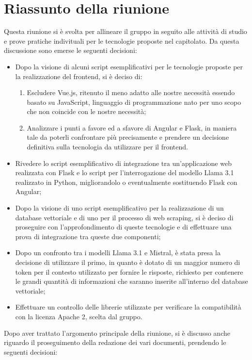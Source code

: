 \section{Riassunto della riunione}
Questa riunione si è svolta per allineare il gruppo in seguito alle attività di studio e prove pratiche indivituali per le tecnologie proposte nel capitolato. Da questa discussione sono emerse le seguenti decisioni:
\begin{itemize}
    \item Dopo la visione di alcuni script esemplificativi per le tecnologie proposte per la realizzazione del frontend, si è deciso di:
    \begin{enumerate}
        \item Escludere Vue.js, ritenuto il meno adatto alle nostre necessità essendo basato su JavaScript, linguaggio di programmazione nato per uno scopo che non coincide con le nostre necessità;
        \item Analizzare i punti a favore ed a sfavore di Angular e Flask, in maniera tale da poterli confrontare più precisamente e prendere un decisione definitiva sulla tecnologia da utilizzare per il frontend. 
    \end{enumerate}
    \item Rivedere lo script esemplificativo di integrazione tra un'applicazione web realizzata con Flask e lo script per l'interrogazione del modello Llama 3.1 realizzato in Python, migliorandolo o eventualmente sostituendo Flask con Angular;
    \item Dopo la visione di uno script esemplificativo per la realizzazione di un database vettoriale e di uno per il processo di web scraping, si è deciso di proseguire con l'approfondimento di queste tecnologie e di effettuare una prova di integrazione tra queste due componenti;
    \item Dopo un confronto tra i modelli Llama 3.1 e Mistral, è stata presa la decisione di utilizzare il primo, in quanto è dotato di un maggior numero di token per il contesto utilizzato per fornire le risposte, richiesto per contenere le grandi quantità di informazioni che saranno inserite all'interno del database vettoriale;
    \item Effettuare un controllo delle librerie utilizzate per verificare la compatibilità con la licenza Apache 2, scelta dal gruppo.
\end{itemize}
Dopo aver trattato l'argomento principale della riunione, si è discusso anche riguardo il proseguimento della redazione dei vari documenti, prendendo le seguenti decisioni:
